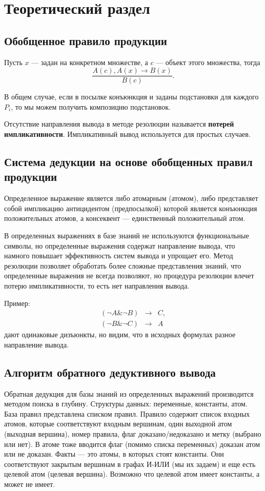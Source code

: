
\chapter{Теоретический раздел}

\section{Обобщенное правило продукции}

Пусть $x$ --- задан на конкретном множестве, а $c$ --- объект этого множества, тогда
$$\frac{A(c), A(x) \rightarrow B(x)}{B(c)}.$$

В общем случае, если в посылке конъюнкция и заданы подстановки для каждого $P_i$, то мы можем получить композицию подстановок.

Отсутствие направления вывода в методе резолюции называется \textbf{потерей импликативности}.
Импликативный вывод используется для простых случаев.

\section{Система дедукции на основе обобщенных правил продукции}

Определенное выражение является либо атомарным (атомом), либо представляет собой импликацию антицидентом (предпосылкой) которой является конъюнкция положительных атомов, а консеквент --- единственный положительный атом.

В определенных выражениях в базе знаний не используются функциональные символы, но определенные выражения содержат направление вывода, что намного повышает эффективность систем вывода и упрощает его. Метод резолюции позволяет обработать более сложные представления знаний, что определенные выражения не всегда позволяют, но процедура резолюции влечет потерю импликативности, то есть нет направления вывода.

Пример:
\begin{eqnarray*}
  (\neg A \& \neg B) &\rightarrow& C, \\
  (\neg B \& \neg C) &\rightarrow& A
\end{eqnarray*}
дают одинаковые дизъюнкты, но видим, что в исходных формулах разное направление вывода.

\section{Алгоритм обратного дедуктивного вывода}

Обратная дедукция для базы знаний из определенных выражений производится методом поиска в глубину. Структуры данных: переменные, константы, атом. База правил представлена списком правил. Правило содержит список входных атомов, которые соответствуют входным вершинам, один выходной атом (выходная вершина), номер правила, флаг доказано/недоказано и метку (выбрано или нет). В атоме тоже вводится флаг (помимо списка переменных) доказан атом или не доказан. Факты --- это атомы, в которых стоят константы. Они соответствуют закрытым вершинам в графах И-ИЛИ (мы их задаем) и еще есть целевой атом (целевая вершина). Возможно что целевой атом имеет константы, а может не имеет.

